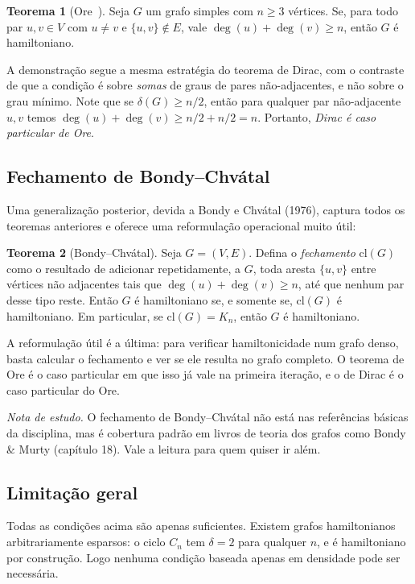 \documentclass[11pt,a4paper]{article}
\theoremstyle{definition}
\newtheorem{teo}{Teorema}[section]
\newcommand{\nota}[1]{%
  \par\medskip
  {\small\color{notagray}\textit{Nota de estudo.} #1}\par\medskip
}
\begin{document}
\begin{teo}[Ore~\citep{ore1960}]
Seja $G$ um grafo simples com $n \geq 3$ vértices. Se, para todo par $u, v \in V$ com $u \neq v$ e $\{u, v\} \notin E$, vale $\deg(u) + \deg(v) \geq n$, então $G$ é hamiltoniano.
\end{teo}

A demonstração segue a mesma estratégia do teorema de Dirac, com o contraste de que a condição é sobre \emph{somas} de graus de pares não-adjacentes, e não sobre o grau mínimo. Note que se $\delta(G) \geq n/2$, então para qualquer par não-adjacente $u, v$ temos $\deg(u) + \deg(v) \geq n/2 + n/2 = n$. Portanto, \emph{Dirac é caso particular de Ore}.

\subsection{Fechamento de Bondy--Chvátal}

Uma generalização posterior, devida a Bondy e Chvátal (1976), captura todos os teoremas anteriores e oferece uma reformulação operacional muito útil:

\begin{teo}[Bondy--Chvátal]
Seja $G = (V, E)$. Defina o \emph{fechamento} $\mathrm{cl}(G)$ como o resultado de adicionar repetidamente, a $G$, toda aresta $\{u, v\}$ entre vértices não adjacentes tais que $\deg(u) + \deg(v) \geq n$, até que nenhum par desse tipo reste. Então $G$ é hamiltoniano se, e somente se, $\mathrm{cl}(G)$ é hamiltoniano. Em particular, se $\mathrm{cl}(G) = K_n$, então $G$ é hamiltoniano.
\end{teo}

A reformulação útil é a última: para verificar hamiltonicidade num grafo denso, basta calcular o fechamento e ver se ele resulta no grafo completo. O teorema de Ore é o caso particular em que isso já vale na primeira iteração, e o de Dirac é o caso particular do Ore.

\nota{O fechamento de Bondy--Chvátal não está nas referências básicas da disciplina, mas é cobertura padrão em livros de teoria dos grafos como Bondy \& Murty (capítulo 18). Vale a leitura para quem quiser ir além.}

\subsection{Limitação geral}

Todas as condições acima são apenas suficientes. Existem grafos hamiltonianos arbitrariamente esparsos: o ciclo $C_n$ tem $\delta = 2$ para qualquer $n$, e é hamiltoniano por construção. Logo nenhuma condição baseada apenas em densidade pode ser necessária.
\end{document}
